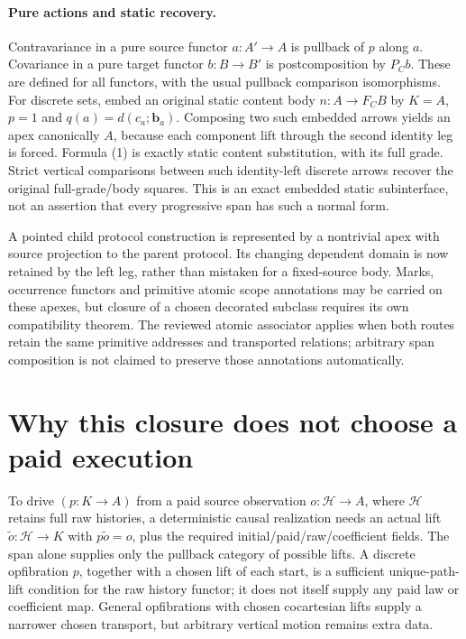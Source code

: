 \documentclass[11pt]{article}
\begin{document}
\paragraph{Pure actions and static recovery.}
Contravariance in a pure source functor $a:A'\to A$ is pullback of $p$ along $a$. Covariance in a pure target functor $b:B\to B'$ is postcomposition by $P_Cb$. These are defined for all functors, with the usual pullback comparison isomorphisms. For discrete sets, embed an original static content body $n:A\to F_CB$ by $K=A$, $p=1$ and $q(a)=d(c_a;\mathbf b_a)$. Composing two such embedded arrows yields an apex canonically $A$, because each component lift through the second identity leg is forced. Formula (1) is exactly static content substitution, with its full grade. Strict vertical comparisons between such identity-left discrete arrows recover the original full-grade/body squares. This is an exact embedded static subinterface, not an assertion that every progressive span has such a normal form.

A pointed child protocol construction is represented by a nontrivial apex with source projection to the parent protocol. Its changing dependent domain is now retained by the left leg, rather than mistaken for a fixed-source body. Marks, occurrence functors and primitive atomic scope annotations may be carried on these apexes, but closure of a chosen decorated subclass requires its own compatibility theorem. The reviewed atomic associator applies when both routes retain the same primitive addresses and transported relations; arbitrary span composition is not claimed to preserve those annotations automatically.

\section{Why this closure does not choose a paid execution}
To drive $(p:K\to A)$ from a paid source observation $o:\mathcal H\to A$, where $\mathcal H$ retains full raw histories, a deterministic causal realization needs an actual lift $\widetilde o:\mathcal H\to K$ with $p\widetilde o=o$, plus the required initial/paid/raw/coefficient fields. The span alone supplies only the pullback category of possible lifts. A discrete opfibration $p$, together with a chosen lift of each start, is a sufficient unique-path-lift condition for the raw history functor; it does not itself supply any paid law or coefficient map. General opfibrations with chosen cocartesian lifts supply a narrower chosen transport, but arbitrary vertical motion remains extra data.
\end{document}
